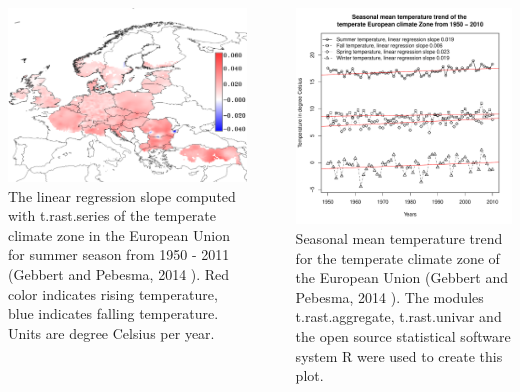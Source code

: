 \documentclass[25pt, margin=0mm, innermargin=15mm, blockverticalspace=15mm, colspace=15mm, subcolspace=8mm]{tikzposter}
\begin{document}
\begin{columns}
{\begin{minipage}{0.5\linewidth}
\includegraphics[scale=0.5]{images/summer_mean_temp_slope.pdf}
The linear regression slope computed with t.rast.series of the temperate climate zone in the European Union  
for summer season from 1950 - 2011 (Gebbert and Pebesma, 2014 \cite{Gebbert20141}). Red color
indicates rising temperature, blue indicates falling temperature. Units are degree Celsius per year.
\end{minipage}
~
\begin{minipage}{0.5\linewidth}
\includegraphics[scale=1.25]{images/Seasonal_temperature_trend_Europe_1950_2010.pdf}
Seasonal mean temperature trend for the temperate climate zone of the European Union 
(Gebbert and Pebesma, 2014 \cite{Gebbert20141}). The modules t.rast.aggregate, 
t.rast.univar and the open source statistical software system R
were used to create this plot.
\end{minipage}
}


\end{columns}
\end{document}
